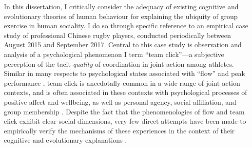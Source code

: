 In this dissertation, I critically consider the adequacy of existing cognitive and evolutionary theories of human behaviour for explaining the ubiquity of group exercise in human sociality.  I do so through specific reference to an empirical case study of professional Chinese rugby players, conducted periodically between August 2015 and September 2017. Central to this case study is observation and analysis of a psychological phenomenon I term ``team click''---a subjective perception  of the tacit \textit{quality} of coordination in joint action among athletes.  Similar in many respects to psychological states associated with ``flow'' and peak performance \citep{Csikszentmihalyi1992}, team click is anecdotally common in a wide range of joint action contexts, and is often associated in these contexts with psychological processes of positive affect and wellbeing, as well as personal agency, social affiliation, and group membership \citep{Marsh2009, Wheatley2012}.  Despite the fact that the phenomenologies of flow and team click exhibit clear social dimensions, very few direct attempts have been made to empirically verify the mechanisms of these experiences in the context of their cognitive and evolutionary explanations \citep[but, for (neuro)cognitive see][]{Dietrich2004,Dietrich2011}\citep[and for an evolutionary framing, see see][]{Slingerland2014,Haidt2007}.

